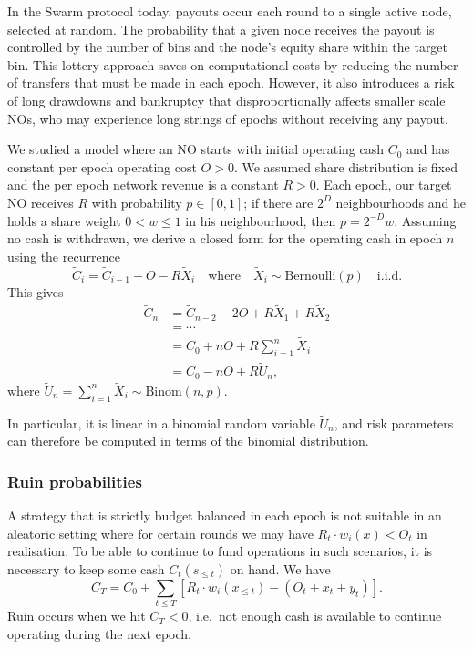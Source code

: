 In the Swarm protocol today, payouts occur each round to a single active node, selected at random.
%
The probability that a given node receives the payout is controlled by the number of bins and the node's equity share within the target bin.
%
This lottery approach saves on computational costs by reducing the number of transfers that must be made in each epoch.
%
However, it also introduces a risk of long drawdowns and bankruptcy that disproportionally affects smaller scale NOs, who may experience long strings of epochs without receiving any payout.

We studied a model where an NO starts with initial operating cash $C_0$ and has constant per epoch operating cost $O>0$.
%
We assumed share distribution is fixed and the per epoch network revenue is a constant $R>0$.
%
Each epoch, our target NO receives $R$ with probability $p\in[0,1]$; if there are $2^D$ neighbourhoods and he holds a share weight $0<w\leq 1$ in his neighbourhood, then $p=2^{-D}w$.
%
Assuming no cash is withdrawn, we derive a closed form for the operating cash in epoch $n$ using the recurrence
%
\[
  \tilde{C}_i = \tilde C_{i-1} - O - R\tilde{X}_i \quad \text{where} \quad \tilde{X}_i \sim \mathrm{Bernoulli}(p) \quad \text{i.i.d.}
\]
This gives 
\begin{align*}
  \tilde C_n &= \tilde C_{n-2} - 2O + R\tilde X_1 + R\tilde X_2 \\
  & =\cdots \\
  &= C_0 + nO + R\sum_{i=1}^n \tilde X_i \\
  &= C_0 - nO + R\tilde U_n,
\end{align*}
where $\tilde U_n = \sum_{i=1}^n \tilde X_i \sim \mathrm{Binom}(n,p)$.

In particular, it is linear in a binomial random variable $\tilde U_n$, and risk parameters can therefore be computed in terms of the binomial distribution.

\subsubsection{Ruin probabilities}


A strategy that is strictly budget balanced in each epoch is not suitable in an aleatoric setting where for certain rounds we may have $R_t\cdot w_i(x) < O_t$ in realisation.
%
To be able to continue to fund operations in such scenarios, it is necessary to keep some cash $C_t(s_{\leq t})$ on hand.
%
We have
\[
  C_T = C_0 + \sum_{t\leq T} \left[ R_t\cdot w_i(x_{\leq t}) - (O_t + x_t + y_t) \right].
\]
Ruin occurs when we hit $C_T < 0$, i.e.~not enough cash is available to continue operating during the next epoch.

